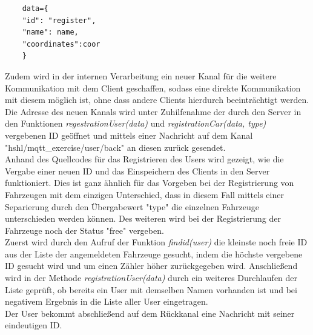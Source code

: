 \documentclass[conference]{IEEEtran}
\begin{document}
\begin{lstlisting}
    data={
    "id": "register",
    "name": name,
    "coordinates":coor
    }	
\end{lstlisting}
Zudem wird in der internen Verarbeitung ein neuer Kanal für die weitere Kommunikation mit dem Client geschaffen, sodass eine direkte Kommunikation mit diesem möglich ist, ohne dass andere Clients hierdurch beeinträchtigt werden. Die Adresse des neuen Kanals wird unter Zuhilfenahme  der durch den Server in den Funktionen \textit{regestrationUser(data)} und \textit{registrationCar(data, type)} vergebenen ID geöffnet und mittels einer Nachricht auf dem Kanal \textsf{"hshl/mqtt\_exercise/user/back"} an diesen zurück gesendet. \\
Anhand des Quellcodes für das Registrieren des Users wird gezeigt, wie die Vergabe einer neuen ID und das Einspeichern des Clients in den Server funktioniert. Dies ist ganz ähnlich für das Vorgeben bei der Registrierung von Fahrzeugen mit dem einzigen Unterschied, dass in diesem Fall mittels einer Separierung durch den Übergabewert "type" die einzelnen Fahrzeuge unterschieden werden können. Des weiteren wird bei der Registrierung der Fahrzeuge noch der Status "free" vergeben.\\
Zuerst wird durch den Aufruf der Funktion \textit{findid(user)} die kleinste noch freie ID aus der Liste der angemeldeten Fahrzeuge gesucht, indem die höchste vergebene ID gesucht wird und um einen Zähler höher zurückgegeben wird. Anschließend wird in der Methode \textit{registrationUser(data)} durch ein weiteres Durchlaufen der Liste geprüft, ob bereits ein User mit demselben Namen vorhanden ist und bei negativem Ergebnis in die Liste aller User eingetragen.\\ Der User bekommt abschließend auf dem Rückkanal eine Nachricht mit seiner eindeutigen ID. 
\end{document}
